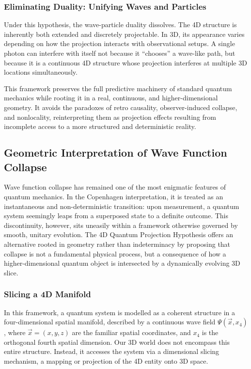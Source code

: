 \documentclass[12pt]{article}
\begin{document}
\subsubsection*{Eliminating Duality: Unifying Waves and Particles}

Under this hypothesis, the wave-particle duality dissolves. The 4D structure is inherently both extended and discretely projectable. In 3D, its appearance varies depending on how the projection interacts with observational setups. A single photon can interfere with itself not because it “chooses” a wave-like path, but because it is a continuous 4D structure whose projection interferes at multiple 3D locations simultaneously.

This framework preserves the full predictive machinery of standard quantum mechanics while rooting it in a real, continuous, and higher-dimensional geometry. It avoids the paradoxes of retro causality, observer-induced collapse, and nonlocality, reinterpreting them as projection effects resulting from incomplete access to a more structured and deterministic reality.


\subsection{Geometric Interpretation of Wave Function Collapse}

Wave function collapse has remained one of the most enigmatic features of quantum mechanics. In the Copenhagen interpretation, it is treated as an instantaneous and non-deterministic transition: upon measurement, a quantum system seemingly leaps from a superposed state to a definite outcome. This discontinuity, however, sits uneasily within a framework otherwise governed by smooth, unitary evolution. The 4D Quantum Projection Hypothesis offers an alternative rooted in geometry rather than indeterminacy by proposing that collapse is not a fundamental physical process, but a consequence of how a higher-dimensional quantum object is intersected by a dynamically evolving 3D slice.

\subsubsection*{Slicing a 4D Manifold}

In this framework, a quantum system is modelled as a coherent structure in a four-dimensional spatial manifold, described by a continuous wave field $\Psi(\vec{x}, x_4)$, where $\vec{x} = (x, y, z)$ are the familiar spatial coordinates, and $x_4$ is the orthogonal fourth spatial dimension. Our 3D world does not encompass this entire structure. Instead, it accesses the system via a dimensional slicing mechanism, a mapping or projection of the 4D entity onto 3D space.
\end{document}
